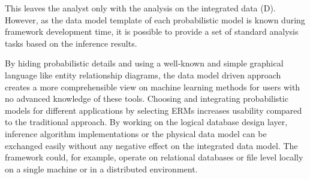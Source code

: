 This leaves the analyst only with the analysis on the integrated data (D). However, as the data model template of each probabilistic model is known during framework development time, it is possible to provide a set of standard analysis tasks based on the inference results.

By hiding probabilistic details and using a well-known and simple graphical language like entity relationship diagrams, the data model driven approach creates a more comprehensible view on machine learning methods for users with no advanced knowledge of these tools. Choosing and integrating probabilistic models for different applications by selecting ERMs increases usability compared to the traditional approach. By working on the logical database design layer, inference algorithm implementations or the physical data model can be exchanged easily without any negative effect on the integrated data model. The framework could, for example, operate on relational databases or file level locally on a single machine or in a distributed environment.
